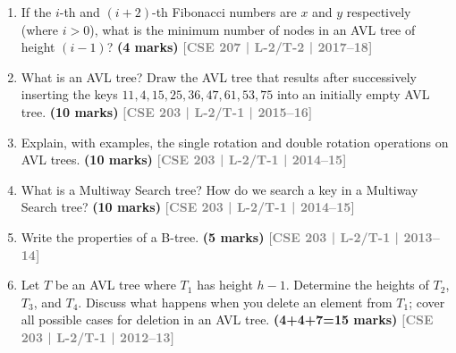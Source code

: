 \documentclass[12pt]{article}
\newcommand{\yr}[1]{\hfill\textcolor{gray}{\small\textbf{[#1]}}}
\newcommand{\mk}[1]{\textcolor{orange!70!black}{\small\textbf{(#1 marks)}}}
\begin{document}
\begin{enumerate}
\item If the $i$-th and $(i+2)$-th Fibonacci numbers are $x$ and $y$ respectively (where $i > 0$), what is the minimum number of nodes in an AVL tree of height $(i-1)$? \mk{4}
\yr{CSE 207 | L-2/T-2 | 2017--18}


\item What is an AVL tree? Draw the AVL tree that results after successively inserting the keys $11, 4, 15, 25, 36, 47, 61, 53, 75$ into an initially empty AVL tree. \mk{10}
\yr{CSE 203 | L-2/T-1 | 2015--16}


\item Explain, with examples, the single rotation and double rotation operations on AVL trees. \mk{10}
\yr{CSE 203 | L-2/T-1 | 2014--15}


\item What is a Multiway Search tree? How do we search a key in a Multiway Search tree? \mk{10}
\yr{CSE 203 | L-2/T-1 | 2014--15}


\item Write the properties of a B-tree. \mk{5}
\yr{CSE 203 | L-2/T-1 | 2013--14}


\item Let $T$ be an AVL tree where $T_1$ has height $h-1$. Determine the heights of $T_2$, $T_3$, and $T_4$. Discuss what happens when you delete an element from $T_1$; cover all possible cases for deletion in an AVL tree. \mk{4+4+7=15}
\yr{CSE 203 | L-2/T-1 | 2012--13}

\begin{center}
\end{center}
\end{enumerate}
\end{document}
